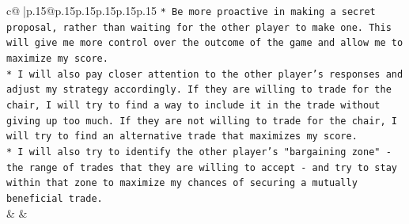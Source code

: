 \documentclass{article}
\begin{document}
{\begin{supertabular}{c@{$\;$}|p{.15\linewidth}@{}p{.15\linewidth}p{.15\linewidth}p{.15\linewidth}p{.15\linewidth}p{.15\linewidth}}
{{{\texttt{* Be more proactive in making a secret proposal, rather than waiting for the other player to make one. This will give me more control over the outcome of the game and allow me to maximize my score.} \\
\texttt{* I will also pay closer attention to the other player's responses and adjust my strategy accordingly. If they are willing to trade for the chair, I will try to find a way to include it in the trade without giving up too much. If they are not willing to trade for the chair, I will try to find an alternative trade that maximizes my score.} \\
\texttt{* I will also try to identify the other player's "bargaining zone" {-} the range of trades that they are willing to accept {-} and try to stay within that zone to maximize my chances of securing a mutually beneficial trade.} \\
            }
        }
    }
    & & \\ \\


\end{supertabular}}
\end{document}
